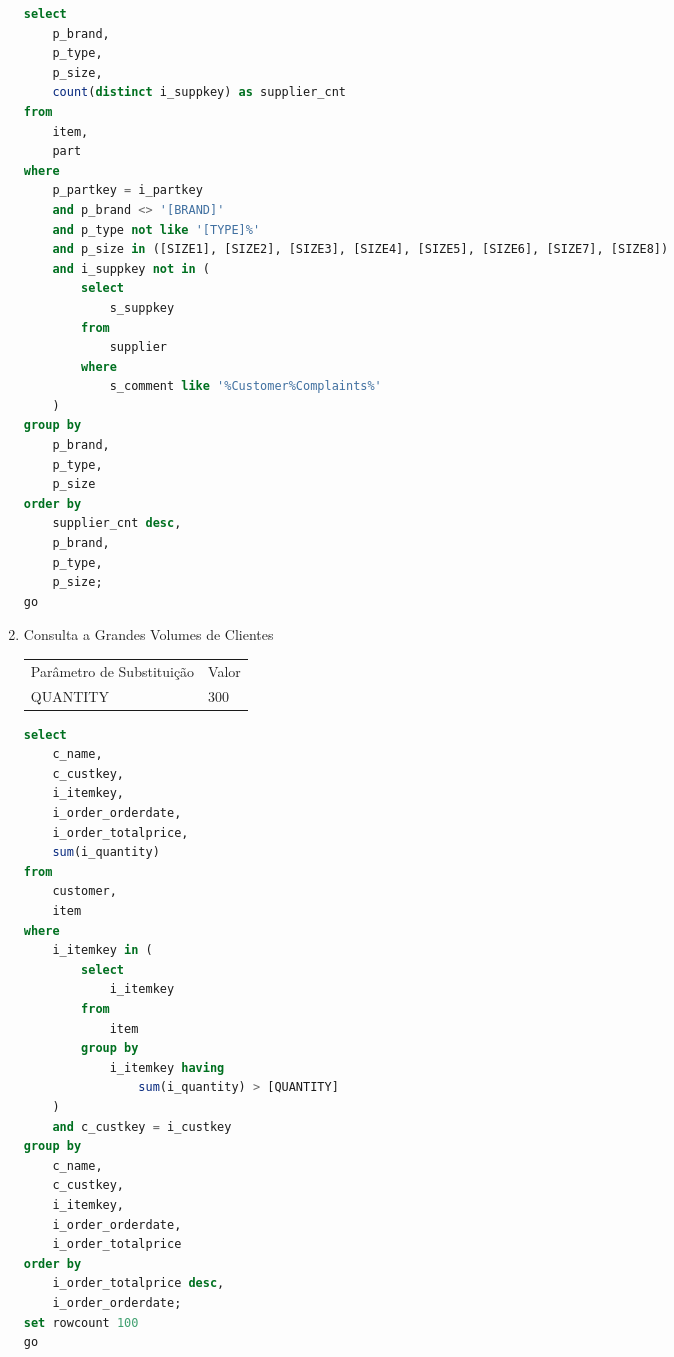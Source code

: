 \begin{enumerate}
	\begin{lstlisting}[language=SQL]
select
    p_brand,
    p_type,
    p_size,
    count(distinct i_suppkey) as supplier_cnt
from
	item,
    part
where
    p_partkey = i_partkey
    and p_brand <> '[BRAND]'
    and p_type not like '[TYPE]%'
    and p_size in ([SIZE1], [SIZE2], [SIZE3], [SIZE4], [SIZE5], [SIZE6], [SIZE7], [SIZE8])
    and i_suppkey not in (
        select
            s_suppkey
        from
            supplier
        where
            s_comment like '%Customer%Complaints%'
    )
group by
    p_brand,
    p_type,
    p_size
order by
    supplier_cnt desc,
    p_brand,
    p_type,
    p_size;
go
	\end{lstlisting}




\item Consulta a Grandes Volumes de Clientes

\begin{tabular}{ll}
	Parâmetro de Substituição & Valor\\
	QUANTITY & 300\\
\end{tabular}

	\begin{lstlisting}[language=SQL]
select
    c_name,
    c_custkey,
    i_itemkey,
    i_order_orderdate,
    i_order_totalprice,
    sum(i_quantity)
from
    customer,
    item
where
    i_itemkey in (
        select
            i_itemkey
        from
            item
        group by
            i_itemkey having
                sum(i_quantity) > [QUANTITY]
    )
    and c_custkey = i_custkey
group by
    c_name,
    c_custkey,
    i_itemkey,
    i_order_orderdate,
    i_order_totalprice
order by
    i_order_totalprice desc,
    i_order_orderdate;
set rowcount 100
go
	\end{lstlisting}
	

\end{enumerate}
